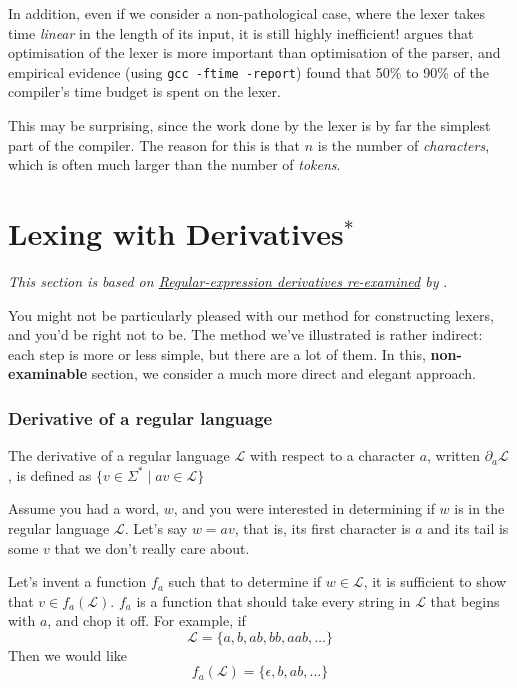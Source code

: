 In addition, even if we consider a non-pathological case, where the lexer takes time \emph{linear} in the length of its input, it is still highly inefficient! \citet{sebesta-1993} argues that optimisation of the lexer is more important than optimisation of the parser, and empirical evidence (using \texttt{gcc -ftime -report}) found that 50\% to 90\% of the compiler's time budget is spent on the lexer.

This may be surprising, since the work done by the lexer is by far the simplest part of the compiler. The reason for this is that $n$ is the number of \emph{characters}, which is often much larger than the number of \emph{tokens}.

\section{Lexing with Derivatives$^{*}$}
\textit{This section is based on \href{https://www.cambridge.org/core/journals/journal-of-functional-programming/article/regularexpression-derivatives-reexamined/E5734B86DEB96C61C69E5CF3C4FB0AFA}{Regular-expression derivatives re-examined} by} \citet{owens-2009}.

You might not be particularly pleased with our method for constructing lexers, and you'd be right not to be. The method we've illustrated is rather indirect: each step is more or less simple, but there are a lot of them. In this, \textsf{\textbf{non-examinable}} section, we consider a much more direct and elegant approach.

\subsubsection{Derivative of a regular language}
\vspace{3mm}

\begin{definition}
    The derivative of a regular language $\mathcal{L}$ with respect to a character $a$, written $\partial_a \mathcal{L}$, is defined as $\{v \in \Sigma^{*} \mid av \in \mathcal{L} \}$
\end{definition}

Assume you had a word, $w$, and you were interested in determining if $w$ is in the regular language $\mathcal{L}$. Let's say $w = av$, that is, its first character is $a$ and its tail is some $v$ that we don't really care about.

Let's invent a function $f_a$ such that to determine if $w \in \mathcal{L}$, it is sufficient to show that $v \in f_a(\mathcal{L})$. $f_a$ is a function that should take every string in $\mathcal{L}$ that begins with $a$, and chop it off. For example, if \[\mathcal{L} = \{ a, b, ab, bb, aab, \ldots \}\] Then we would like \[f_a(\mathcal{L}) = \{ \epsilon, b, ab, \ldots\} \]


